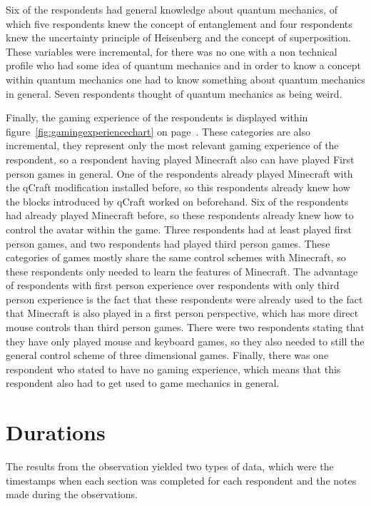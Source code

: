 \documentclass[11pt,twoside]{report} %
\begin{document}
Six of the respondents had general knowledge about quantum mechanics, of which five respondents knew the concept of entanglement and four respondents knew the uncertainty principle of Heisenberg and the concept of superposition. These variables were incremental, for there was no one with a non technical profile who had some idea of quantum mechanics and in order to know a concept within quantum mechanics one had to know something about quantum mechanics in general. Seven respondents thought of quantum mechanics as being weird.

Finally, the gaming experience of the respondents is displayed within figure~\ref{fig:gamingexperiencechart} on page~\pageref{fig:gamingexperiencechart}. These categories are also incremental, they represent only the most relevant gaming experience of the respondent, so a respondent having played Minecraft also can have played First person games in general. One of the respondents already played Minecraft with the qCraft modification installed before, so this respondents already knew how the blocks introduced by qCraft worked on beforehand. Six of the respondents had already played Minecraft before, so these respondents already knew how to control the avatar within the game. Three respondents had at least played first person games, and two respondents had played third person games. These categories of games mostly share the same control schemes with Minecraft, so these respondents only needed to learn the features of Minecraft. The advantage of respondents with first person experience over respondents with only third person experience is the fact that these respondents were already used to the fact that Minecraft is also played in a first person perspective, which has more direct mouse controls than third person games. There were two respondents stating that they have only played mouse and keyboard games, so they also needed to still the general control scheme of three dimensional games. Finally, there was one respondent who stated to have no gaming experience, which means that this respondent also had to get used to game mechanics in general.

\section{Durations}

The results from the observation yielded two types of data, which were the timestamps when each section was completed for each respondent and the notes made during the observations.
\end{document}
